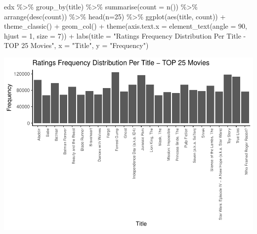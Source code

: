 \documentclass[
]{article}
\newenvironment{Shaded}{}{}
\newcommand{\AttributeTok}[1]{\textcolor[rgb]{0.49,0.56,0.16}{#1}}
\newcommand{\DecValTok}[1]{\textcolor[rgb]{0.25,0.63,0.44}{#1}}
\newcommand{\FunctionTok}[1]{\textcolor[rgb]{0.02,0.16,0.49}{#1}}
\newcommand{\NormalTok}[1]{#1}
\newcommand{\SpecialCharTok}[1]{\textcolor[rgb]{0.25,0.44,0.63}{#1}}
\newcommand{\StringTok}[1]{\textcolor[rgb]{0.25,0.44,0.63}{#1}}
\begin{document}
\begin{Shaded}
\begin{Highlighting}[]
\NormalTok{edx }\SpecialCharTok{\%\textgreater{}\%}
   \FunctionTok{group\_by}\NormalTok{(title) }\SpecialCharTok{\%\textgreater{}\%}
   \FunctionTok{summarise}\NormalTok{(}\AttributeTok{count =} \FunctionTok{n}\NormalTok{()) }\SpecialCharTok{\%\textgreater{}\%}
   \FunctionTok{arrange}\NormalTok{(}\FunctionTok{desc}\NormalTok{(count)) }\SpecialCharTok{\%\textgreater{}\%}
   \FunctionTok{head}\NormalTok{(}\AttributeTok{n=}\DecValTok{25}\NormalTok{) }\SpecialCharTok{\%\textgreater{}\%}
   \FunctionTok{ggplot}\NormalTok{(}\FunctionTok{aes}\NormalTok{(title, count)) }\SpecialCharTok{+}
   \FunctionTok{theme\_classic}\NormalTok{()  }\SpecialCharTok{+}
   \FunctionTok{geom\_col}\NormalTok{() }\SpecialCharTok{+}
   \FunctionTok{theme}\NormalTok{(}\AttributeTok{axis.text.x =} \FunctionTok{element\_text}\NormalTok{(}\AttributeTok{angle =} \DecValTok{90}\NormalTok{, }\AttributeTok{hjust =} \DecValTok{1}\NormalTok{, }\AttributeTok{size =} \DecValTok{7}\NormalTok{)) }\SpecialCharTok{+}
   \FunctionTok{labs}\NormalTok{(}\AttributeTok{title =} \StringTok{"Ratings Frequency Distribution Per Title {-} TOP 25 Movies"}\NormalTok{,}
        \AttributeTok{x =} \StringTok{"Title"}\NormalTok{,}
        \AttributeTok{y =} \StringTok{"Frequency"}\NormalTok{)}
\end{Highlighting}
\end{Shaded}

\begin{center}\includegraphics{MovieLens-Project-Code_files/figure-latex/unnamed-chunk-23-1} \end{center}
\end{document}
